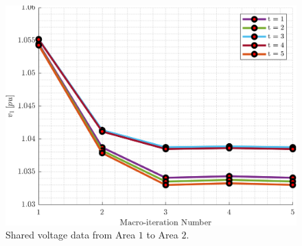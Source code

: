 \documentclass[../../outputs/main.tex]{subfiles}
\begin{document}

    

\begin{figure}[t]
    \centering
    \includegraphics[width=0.8\columnwidth]{../figures/T5-pv20-batt30-genCost/dopf/convergenceCurves/BoundaryVoltage_vs_t_vs_macroItr_T_5_Areas_1_2_genCost_pv_20_batt_30_crop.png}
    \caption{ Shared voltage data from Area $1$ to Area $2$.}
    \label{fig:voltage_1_2}
    \vspace{-4mm}
\end{figure}
\end{document}
